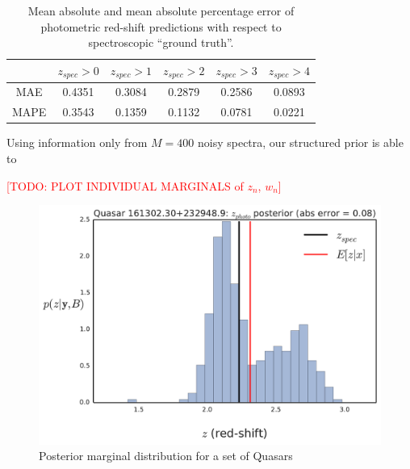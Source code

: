 \documentclass{article}
\newcommand{\red}[1]{\textcolor{red}{[TODO: #1]}}
\begin{document}
\begin{table}[t]
\caption{Mean absolute and mean absolute percentage error of photometric red-shift predictions with respect to spectroscopic ``ground truth''. }
\label{sample-table}
\vskip 0.15in
\begin{center}
\begin{small}
\begin{sc}
\begin{tabular}{cccccc}
\hline
\abovespace\belowspace
        &  $z_{spec} > 0$ & $z_{spec} > 1$ & $z_{spec} > 2$ & $z_{spec} > 3$ & $z_{spec} > 4$ \\
\hline
\abovespace
MAE  &  0.4351 & 0.3084 & 0.2879 & 0.2586 & 0.0893 \\
MAPE &  0.3543 & 0.1359 & 0.1132 & 0.0781 & 0.0221 \\
\hline
\end{tabular}
\end{sc}
\end{small}
\end{center}
\vskip -0.1in
\end{table}




Using information only from $M = 400$ noisy spectra, our structured prior is able to 



\red{PLOT INDIVIDUAL MARGINALS of $z_n$, $w_n$}

\begin{figure}[ht]
\vskip 0.2in
\begin{center}
\centerline{\includegraphics[width=\columnwidth]{../figs/quasar_plots/quasar_147_posterior_z}}
\vskip -0.2in
\caption{Posterior marginal distribution for a set of Quasars}
\label{fig:frames}
\end{center}
\end{figure}
\end{document}
